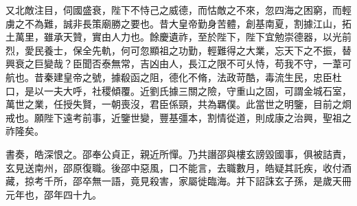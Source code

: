 \begin{pinyinscope}
 
 
 
 又北敵注目，伺國盛衰，陛下不恃己之威德，而怙敵之不來，忽四海之困窮，而輕虜之不為難，誠非長策廟勝之要也。昔大皇帝勤身苦體，創基南夏，割據江山，拓土萬里，雖承天贊，實由人力也。餘慶遺祚，至於陛下，陛下宜勉崇德器，以光前烈，愛民養士，保全先軌，何可忽顯祖之功勤，輕難得之大業，忘天下之不振，替興衰之巨變哉？臣聞否泰無常，吉凶由人，長江之限不可乆恃，苟我不守，一葦可航也。昔秦建皇帝之號，據殽函之阻，德化不脩，法政苛酷，毒流生民，忠臣杜口，是以一夫大呼，社稷傾覆。近劉氏據三關之險，守重山之固，可謂金城石室，萬世之業，任授失賢，一朝喪沒，君臣係頸，共為羈僕。此當世之明鑒，目前之烱戒也。願陛下遠考前事，近鑒世變，豐基彊本，割情從道，則成康之治興，聖祖之祚隆矣。
 
 
書奏，皓深恨之。邵奉公貞正，親近所憚。乃共譖邵與樓玄謗毀國事，俱被詰責，玄見送南州，邵原復職。後邵中惡風，口不能言，去職數月，皓疑其託疾，收付酒藏，掠考千所，邵卒無一語，竟見殺害，家屬徙臨海。并下詔誅玄子孫，是歲天冊元年也，邵年四十九。
 
 
\end{pinyinscope}